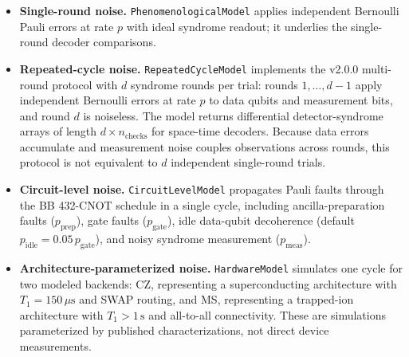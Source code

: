\documentclass[pdflatex,sn-mathphys-num]{sn-jnl}
\theoremstyle{thmstyleone}
\theoremstyle{thmstyletwo}
\theoremstyle{thmstylethree}
\begin{document}
\begin{itemize}[leftmargin=1.6em,itemsep=2pt]
  \item \textbf{Single-round noise.} \texttt{PhenomenologicalModel} applies independent Bernoulli Pauli errors at rate $p$ with ideal syndrome readout; it underlies the single-round decoder comparisons.
  \item \textbf{Repeated-cycle noise.} \texttt{RepeatedCycleModel} implements the v2.0.0 multi-round protocol with $d$ syndrome rounds per trial: rounds $1,\ldots,d-1$ apply independent Bernoulli errors at rate $p$ to data qubits and measurement bits, and round $d$ is noiseless. The model returns differential detector-syndrome arrays of length $d\times n_{\mathrm{checks}}$ for space-time decoders. Because data errors accumulate and measurement noise couples observations across rounds, this protocol is not equivalent to $d$ independent single-round trials.
  \item \textbf{Circuit-level noise.} \texttt{CircuitLevelModel} propagates Pauli faults through the BB 432-CNOT schedule in a single cycle, including ancilla-preparation faults ($p_{\mathrm{prep}}$), gate faults ($p_{\mathrm{gate}}$), idle data-qubit decoherence (default $p_{\mathrm{idle}}=0.05\,p_{\mathrm{gate}}$), and noisy syndrome measurement ($p_{\mathrm{meas}}$).
  \item \textbf{Architecture-parameterized noise.} \texttt{HardwareModel} simulates one cycle for two modeled backends: CZ, representing a superconducting architecture with $T_1=150\,\mu\text{s}$ and SWAP routing, and MS, representing a trapped-ion architecture with $T_1>1\,\text{s}$ and all-to-all connectivity. These are simulations parameterized by published characterizations, not direct device measurements.
\end{itemize}
\end{document}
